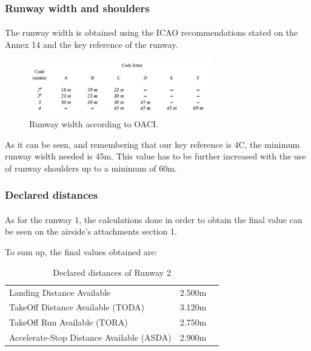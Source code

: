 		\subsubsection{Runway width and shoulders}
		\paragraph{}The runway width is obtained using the ICAO recommendations stated on the Annex 14 and the key reference of the runway. 
	
		\begin{figure}[H]
			\centering
			\includegraphics[clip, trim=0cm 0cm 0cm 0cm, width=0.7\textwidth]{./images/Annex14/RunwayWidth}
			\caption{Runway width according to OACI.} %
			\label{} %
		\end{figure}
	
		As it can be seen, and remembering that our key reference is 4C, the minimum runway width needed is 45m. This value has to be further increased with the use of runway shoulders up to a minimum of 60m. 
	
		\subsubsection{Declared distances}
		\paragraph{} As for the runway 1, the calculations done in order to obtain the final value can be seen on the airside’s attachments section 1. 
	
		To sum up, the final values obtained are:
	
		\begin{table}[htb]
			\centering
			\begin{tabular}{ll p{5cm}}
				\midrule[2pt]
				Landing Distance Available & 2.500m\\
				TakeOff Distance Available (TODA) & 3.120m\\
				TakeOff Run Available (TORA)& 2.750m\\
				Accelerate-Stop Distance Available (ASDA)& 2.900m\\
				\bottomrule[2pt]
			\end{tabular}
			\caption{Declared distances of  Runway 2}
			\label{DeclareddistancesRW2}
		\end{table}
	
